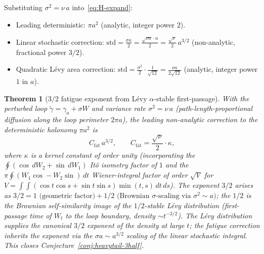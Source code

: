 \documentclass[11pt,a4paper]{article}
\theoremstyle{plain}
\newtheorem{theorem}{Theorem}[section]
\theoremstyle{definition}
\theoremstyle{remark}
\begin{document}
Substituting $\sigma^{2}=\nu\,a$ into~\eqref{eq:H-expand}:
\begin{itemize}[leftmargin=1.2em,itemsep=1pt]
\item Leading deterministic: $\pi a^{2}$ (analytic, integer power $2$).
\item Linear stochastic correction:
  $\mathrm{std}=\tfrac{\sigma a}{2}=\tfrac{\sqrt{\nu a}\cdot a}{2}
  =\tfrac{\sqrt{\nu}}{2}\,a^{3/2}$ (non-analytic, fractional power $3/2$).
\item Quadratic L\'evy area correction:
  $\mathrm{std}=\tfrac{\sigma^{2}}{2}\cdot\tfrac{1}{\sqrt{12}}
  =\tfrac{\nu a}{2\sqrt{12}}$ (analytic, integer power $1$ in $a$).
\end{itemize}

\begin{theorem}[$3/2$ fatigue exponent from L\'evy $\alpha$-stable
first-passage]\label{thm:levy-3half}
With the perturbed loop $\tilde\gamma=\gamma_{a}+\sigma W$ and variance
rate $\sigma^{2}=\nu\,a$ (path-length-proportional diffusion along the
loop perimeter $2\pi a$), the leading non-analytic correction to the
deterministic holonomy $\pi a^{2}$ is
\begin{equation}\label{eq:cfat-formula}
  C_{\mathrm{fat}}\,a^{3/2},\qquad
  C_{\mathrm{fat}}=\frac{\sqrt{\nu}}{2}\cdot\kappa,
\end{equation}
where $\kappa$ is a kernel constant of order unity (incorporating the
$\oint(\cos\,dW_{2}+\sin\,dW_{1})$ It\^o isometry factor of $1$ and the
$\pi\oint(W_{1}\cos-W_{2}\sin)\,dt$ Wiener-integral factor of order
$\sqrt{V}$ for $V=\int\!\!\int(\cos t\cos s+\sin t\sin s)\min(t,s)\,dt\,ds$).
The exponent $3/2$ arises as
$3/2=1\text{ (geometric factor)}+1/2\text{ (Brownian $\sigma$-scaling via $\sigma^{2}\sim a$)}$;
the $1/2$ is the Brownian self-similarity image of the $1/2$-stable
L\'evy distribution (first-passage time of $W_{t}$ to the loop boundary,
density $\sim t^{-3/2}$). The L\'evy distribution supplies the canonical
$3/2$ exponent of the density at large $t$; the fatigue correction
inherits the exponent via the $\sigma a\sim a^{3/2}$ scaling of the
linear stochastic integral. This closes
Conjecture~\ref{conj:heavytail-3half}.
\end{theorem}
\end{document}
